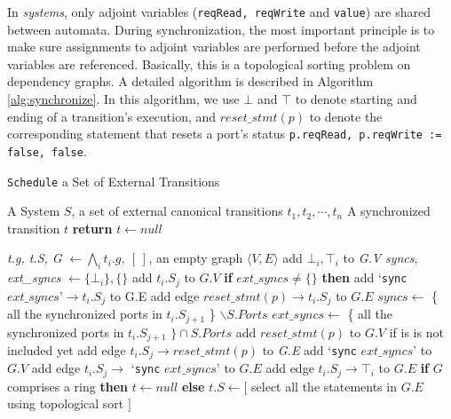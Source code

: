 In \lang{} \emph{systems}, only adjoint variables (\texttt{reqRead, reqWrite} and \texttt{value}) are shared between automata. During synchronization, the most important principle is to make sure assignments to adjoint variables are performed before the adjoint variables are referenced. Basically, this is a topological sorting problem on dependency graphs. A detailed algorithm is described in Algorithm \ref{alg:synchronize}. In this algorithm, we use $\bot$ and $\top$ to denote starting and ending of a transition's execution, and $reset\_stmt(p)$ to denote the corresponding statement that resets a port's status \texttt{p.reqRead, p.reqWrite := false, false}.

\begin{algorithm}[t]
    \caption{\texttt{Schedule} a Set of External Transitions}
    \label{alg:synchronize}
    \small
    \begin{algorithmic}[1]
        \REQUIRE A System $S$, a set of external canonical transitions $t_1,t_2,\cdots,t_n$
        \ENSURE A synchronized transition $t$
            \STATE \textbf{return} $t\leftarrow null$
        \ENDIF

        \STATE \emph{t.g, t.S, G} $\leftarrow \bigwedge_i t_i.g,\:[\:]$, an empty graph $\langle V,E\rangle$
            \STATE add $\bot_i, \top_i$ to \emph{G.V}
            \STATE \emph{syncs}, \emph{ext\_syncs} $\leftarrow\{\bot_i\},\{\}$
                \STATE add $t_i.S_{j}$ to $G.V$
                \STATE \textbf{if} $ext\_syncs\neq\{\}$ \textbf{then} add `\texttt{sync} $ext\_syncs\mbox{'}\rightarrow t_i.S_j$ to G.E 
                    \STATE add edge $reset\_stmt(p)\rightarrow t_i.S_j$ to $G.E$
                \ENDFOR
                \STATE $syncs\leftarrow$ \{ all the synchronized ports in $t_i.S_{j+1}$ \} $\backslash S.Ports$ \STATE $ext\_syncs\leftarrow$ \{ all the synchronized ports in $t_i.S_{j+1}$ $\}\cap S.Ports$
                        \STATE add $reset\_stmt(p)$ to $G.V$ if is is not included yet
                        \STATE add edge $t_i.S_j \rightarrow reset\_stmt(p)$ to \emph{G.E}
                    \ENDFOR
                        \STATE add `\texttt{sync} $ext\_syncs$' to $G.V$
                        \STATE add edge $t_i.S_j\rightarrow$ `\texttt{sync} $ext\_syncs$' to $G.E$
                    \ENDIF
                \ELSE
                    \STATE add edge $t_i.S_j\rightarrow \top_i$ to $G.E$
                \ENDIF
            \ENDFOR
        \ENDFOR
        \STATE \textbf{if} $G$ comprises a ring \textbf{then} $t\leftarrow null$
        \STATE \textbf{else} $t.S\leftarrow[$ select all the statements in $G.E$ using topological sort $]$
    \end{algorithmic}
\end{algorithm}

